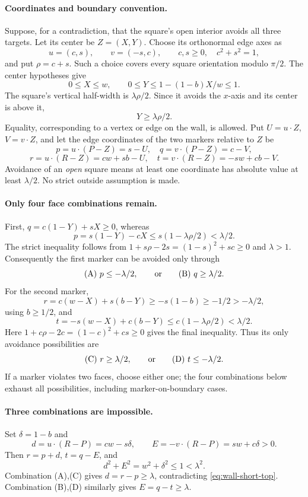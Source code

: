 \documentclass[11pt]{article}
\begin{document}
\paragraph{Coordinates and boundary convention.}
Suppose, for a contradiction, that the square's open interior avoids all
three targets. Let its center be $Z=(X,Y)$. Choose its orthonormal edge
axes as
\[
 u=(c,s),\qquad v=(-s,c),\qquad c,s\ge0,\quad c^2+s^2=1,
\]
and put $\rho=c+s$. Such a choice covers every square orientation modulo
$\pi/2$. The center hypotheses give
\[
 0\le X\le w,\qquad 0\le Y\le1-(1-b)X/w\le1.
\]
The square's vertical half-width is $\lambda\rho/2$. Since it avoids the
$x$-axis and its center is above it,
\begin{equation}\label{eq:wall-bottom}
 Y\ge\lambda\rho/2.
\end{equation}
Equality, corresponding to a vertex or edge on the wall, is allowed.
Put $U=u\cdot Z$, $V=v\cdot Z$, and let the edge coordinates of the two
markers relative to $Z$ be
\[
 p=u\cdot(P-Z)=s-U,\quad q=v\cdot(P-Z)=c-V,
\]
\[
 r=u\cdot(R-Z)=cw+sb-U,\quad t=v\cdot(R-Z)=-sw+cb-V.
\]
Avoidance of an \emph{open} square means at least one coordinate has
absolute value at least $\lambda/2$. No strict outside assumption is made.

\paragraph{Only four face combinations remain.}
First, $q=c(1-Y)+sX\ge0$, whereas
\[
 p=s(1-Y)-cX\le s(1-\lambda\rho/2)<\lambda/2.
\]
The strict inequality follows from
$1+s\rho-2s=(1-s)^2+sc\ge0$ and $\lambda>1$.
Consequently the first marker can be avoided only through
\[
 \text{(A)}\ p\le-\lambda/2,
 \qquad\hbox{or}\qquad
 \text{(B)}\ q\ge\lambda/2.
\]
For the second marker,
\[
 r=c(w-X)+s(b-Y)\ge-s(1-b)\ge-1/2>-\lambda/2,
\]
using $b\ge1/2$, and
\[
 t=-s(w-X)+c(b-Y)\le c(1-\lambda\rho/2)<\lambda/2.
\]
Here $1+c\rho-2c=(1-c)^2+cs\ge0$ gives the final inequality.
Thus its only avoidance possibilities are
\[
 \text{(C)}\ r\ge\lambda/2,
 \qquad\hbox{or}\qquad
 \text{(D)}\ t\le-\lambda/2.
\]
If a marker violates two faces, choose either one; the four combinations
below exhaust all possibilities, including marker-on-boundary cases.

\paragraph{Three combinations are impossible.}
Set $\delta=1-b$ and
\[
 d=u\cdot(R-P)=cw-s\delta,
 \qquad E=-v\cdot(R-P)=sw+c\delta>0.
\]
Then $r=p+d$, $t=q-E$, and
\begin{equation}\label{eq:wall-short-top}
 d^2+E^2=w^2+\delta^2\le1<\lambda^2.
\end{equation}
Combination (A),(C) gives $d=r-p\ge\lambda$, contradicting
\eqref{eq:wall-short-top}. Combination (B),(D) similarly gives
$E=q-t\ge\lambda$.
\end{document}
